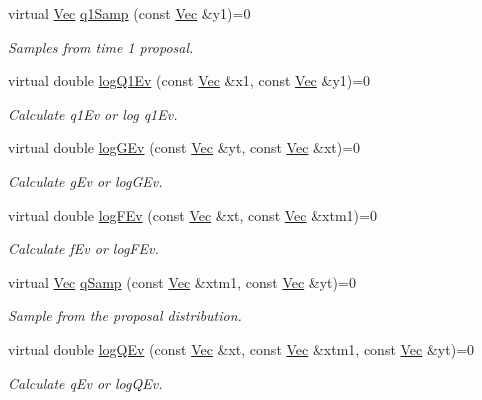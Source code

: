 \begin{DoxyCompactItemize}
virtual \hyperlink{apf__filter_8h_a4c7df05c6f5e8a0d15ae14bcdbc07152}{Vec} \hyperlink{classSISRSmoother_a1c7a32fa83f90fa6666bd0e739189275}{q1\+Samp} (const \hyperlink{apf__filter_8h_a4c7df05c6f5e8a0d15ae14bcdbc07152}{Vec} \&y1)=0
\begin{DoxyCompactList}\small\item\em Samples from time 1 proposal. \end{DoxyCompactList}\item 
virtual double \hyperlink{classSISRSmoother_a316ce1b0f0e18d277b0687f727a00a0a}{log\+Q1\+Ev} (const \hyperlink{apf__filter_8h_a4c7df05c6f5e8a0d15ae14bcdbc07152}{Vec} \&x1, const \hyperlink{apf__filter_8h_a4c7df05c6f5e8a0d15ae14bcdbc07152}{Vec} \&y1)=0
\begin{DoxyCompactList}\small\item\em Calculate q1\+Ev or log q1\+Ev. \end{DoxyCompactList}\item 
virtual double \hyperlink{classSISRSmoother_a15cafa515e345d7ea5b3afefcca27386}{log\+G\+Ev} (const \hyperlink{apf__filter_8h_a4c7df05c6f5e8a0d15ae14bcdbc07152}{Vec} \&yt, const \hyperlink{apf__filter_8h_a4c7df05c6f5e8a0d15ae14bcdbc07152}{Vec} \&xt)=0
\begin{DoxyCompactList}\small\item\em Calculate g\+Ev or log\+G\+Ev. \end{DoxyCompactList}\item 
virtual double \hyperlink{classSISRSmoother_aa9bf9fcee0283b90984964e7a76f6096}{log\+F\+Ev} (const \hyperlink{apf__filter_8h_a4c7df05c6f5e8a0d15ae14bcdbc07152}{Vec} \&xt, const \hyperlink{apf__filter_8h_a4c7df05c6f5e8a0d15ae14bcdbc07152}{Vec} \&xtm1)=0
\begin{DoxyCompactList}\small\item\em Calculate f\+Ev or log\+F\+Ev. \end{DoxyCompactList}\item 
virtual \hyperlink{apf__filter_8h_a4c7df05c6f5e8a0d15ae14bcdbc07152}{Vec} \hyperlink{classSISRSmoother_a15f1f84cfb370dfdbb27a6360c840c60}{q\+Samp} (const \hyperlink{apf__filter_8h_a4c7df05c6f5e8a0d15ae14bcdbc07152}{Vec} \&xtm1, const \hyperlink{apf__filter_8h_a4c7df05c6f5e8a0d15ae14bcdbc07152}{Vec} \&yt)=0
\begin{DoxyCompactList}\small\item\em Sample from the proposal distribution. \end{DoxyCompactList}\item 
virtual double \hyperlink{classSISRSmoother_a73f4cea772e649b791b66473408b9b61}{log\+Q\+Ev} (const \hyperlink{apf__filter_8h_a4c7df05c6f5e8a0d15ae14bcdbc07152}{Vec} \&xt, const \hyperlink{apf__filter_8h_a4c7df05c6f5e8a0d15ae14bcdbc07152}{Vec} \&xtm1, const \hyperlink{apf__filter_8h_a4c7df05c6f5e8a0d15ae14bcdbc07152}{Vec} \&yt)=0
\begin{DoxyCompactList}\small\item\em Calculate q\+Ev or log\+Q\+Ev. \end{DoxyCompactList}\end{DoxyCompactItemize}


